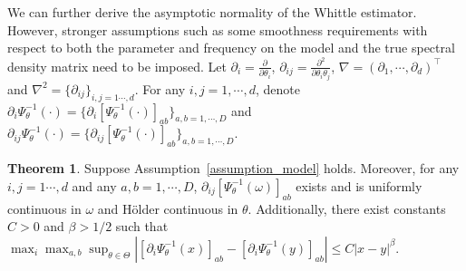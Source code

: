 \documentclass[11pt]{article}
\numberwithin{equation}{section}
\theoremstyle{plain}
\theoremstyle{definition}
\theoremstyle{definition}
\theoremstyle{assumption}
\theoremstyle{proposition}
\theoremstyle{proposition}
\theoremstyle{example}
\theoremstyle{lemma}
\theoremstyle{theorem}
\newtheorem{theorem}{Theorem}[section]
\theoremstyle{remark}
\begin{document}
We can further derive the asymptotic normality of the Whittle estimator. However, stronger assumptions such as some smoothness requirements with respect to both the parameter and frequency on the model and the true spectral density matrix need to be imposed. Let $\partial_{i} = \frac{\partial}{\partial\theta_i}$, $\partial_{ij} = \frac{\partial^2}{\partial\theta_i\theta_j}$, $\nabla = (\partial_1,\cdots,\partial_d)^{\top}$ and $\nabla^2 = \{\partial_{ij}\}_{i,j=1\cdots,d}$. For any $i,j=1,\cdots,d$, denote $\partial_{i}\Psi_{\theta}^{-1}(\cdot) = \{\partial_{i}[\Psi_{\theta}^{-1}(\cdot)]_{ab}\}_{a,b=1,\cdots,D}$ and $\partial_{ij}\Psi_{\theta}^{-1}(\cdot) = \{\partial_{ij}[\Psi_{\theta}^{-1}(\cdot)]_{ab}\}_{a,b=1,\cdots,D}$.
\begin{theorem}\label{thm_asymptotic_normality_Whittle}
Suppose Assumption~\ref{assumption_model} holds.  Moreover, for any $i,j=1\cdots,d$ and any $a,b=1,\cdots,D$, $\partial_{ij}[\Psi_{\theta}^{-1}(\omega)]_{ab}$ exists and is uniformly continuous in $\omega$ and H{\"o}lder continuous in $\theta$. Additionally, there exist constants $C>0$ and $\beta>1/2$ such that $\max_i\max_{a,b}\sup_{\theta\in\Theta}|[\partial_i\Psi_{\theta}^{-1}(x)]_{ab} - [\partial_i\Psi_{\theta}^{-1}(y)]_{ab}|\leqslant C|x-y|^{\beta}$. 


\end{theorem}
\end{document}
